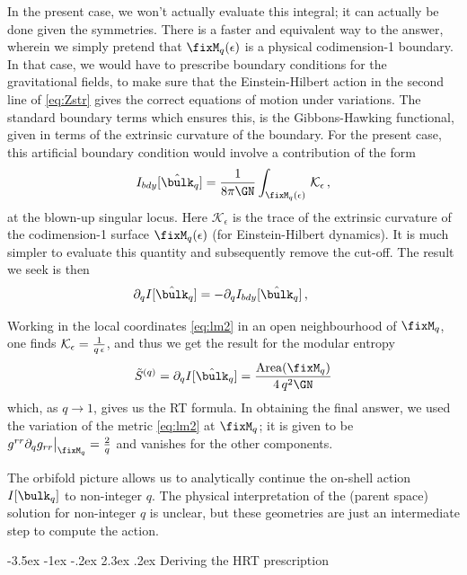 \documentclass[12pt,openany]{book}
\makeatletter
\renewcommand\section{\@startsection {section}{1}{\z@}%
                                   {-3.5ex \@plus -1ex \@minus -.2ex}%
                                   {2.3ex \@plus.2ex}%
                                   {\normalfont\large\bfseries}}
\makeatother
\begin{document}
In the present case, we won't actually evaluate this integral; it can actually be done given the symmetries. There is a faster and equivalent way to the answer, wherein we simply pretend that $\fixM_q(\epsilon)$ is a physical codimension-1 boundary. In that case, we would have to prescribe boundary conditions for the gravitational fields, to make sure that the Einstein-Hilbert action in the second line of \eqref{eq:Zstr} gives the correct equations of motion under variations. The standard boundary terms which ensures this, is the Gibbons-Hawking functional, given in terms of the extrinsic curvature of the boundary. For the present case, this artificial boundary condition would involve a contribution of the form
%
\begin{equation}
I_{bdy}[\hat{\bulk}_q]=\frac{1}{8 \pi \GN}\int_{\fixM_q(\epsilon)} \, {\cal K}_\epsilon \,,
\label{}
\end{equation}
%
at the blown-up singular locus. Here $\mathcal{K}_\epsilon$ is the trace of the extrinsic curvature of the codimension-1 surface $\fixM_q(\epsilon)$ (for Einstein-Hilbert dynamics). It is much simpler to evaluate this quantity and subsequently remove the cut-off. The result we seek is then
\begin{equation}
\partial_q I[\hat{\bulk}_q]=-\partial_q I_{bdy}[\hat{\bulk}_q]
\,, \qquad
\label{eq:var2}
\end{equation}
%

Working in the local coordinates \eqref{eq:lm2} in an open neighbourhood of $\fixM_q$, one finds  ${\cal K}_\epsilon=\frac{1}{q \,\epsilon}$, and thus we get the result for the modular entropy
%
\begin{equation}
\tilde{S}^{(q)}  = \partial_q I[\hat{\bulk}_q]= \frac{\text{Area}(\fixM_q)}{4\, q^2 \GN}
\label{eq:renderq}
\end{equation}
%
which, as $q \rightarrow 1$, gives us the RT formula.  In obtaining the final answer, we used the variation of the metric
\eqref{eq:lm2} at $\fixM_q$; it is given to be $g^{r r} \partial_q g_{r r} \big|_{\fixM_q}=\frac{2}{q}$ and vanishes for the other components.

The orbifold picture allows us to analytically continue the on-shell action $I[\bulk_q]$ to non-integer $q$. The physical interpretation of the (parent space) solution for non-integer $q$ is unclear, but these geometries are just an intermediate step to compute the action.


\section{Deriving the HRT prescription}
\label{sec:covgen}
\end{document}
